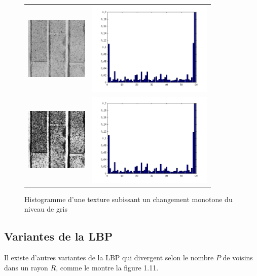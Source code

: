 \begin{figure}[H]
\centering
\begin{tabular}{cc}
\centering

\includegraphics[width=3cm]{Figures/chap1/p1.png}
&
\includegraphics[width=6cm]{Figures/chap1/histcomp1.png}\\

\includegraphics[width=3cm]{Figures/chap1/p2.png}
&
\includegraphics[width=6cm]{Figures/chap1/histcomp2.png}\\
\end{tabular}
\caption[comp]{Histogramme d'une texture subissant un changement monotone du niveau de gris}
\end{figure}


\subsection{Variantes de la LBP}
\indent Il existe d'autres variantes de la LBP qui divergent selon le nombre $P$ de voisins dans un rayon $R$, comme le montre la figure 1.11.\\
 
